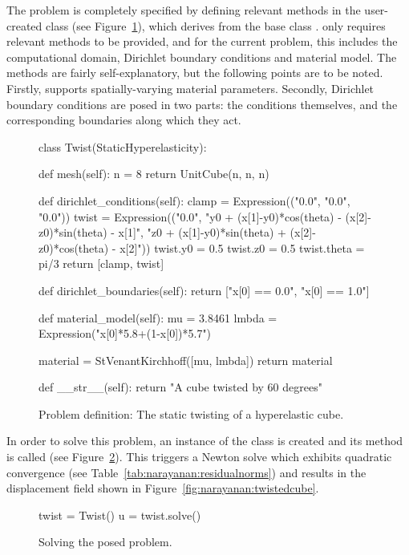 \noindent The problem is completely specified by defining relevant
methods in the user-created class  (see
Figure~\ref{code:narayanan:statictwist}), which derives from the base
class . \twist{} only requires relevant
methods to be provided, and for the current problem, this includes the
computational domain, Dirichlet boundary conditions and material
model. The methods are fairly self-explanatory, but the following
points are to be noted. Firstly, \twist{} supports spatially-varying
material parameters. Secondly, Dirichlet boundary conditions are posed
in two parts: the conditions themselves, and the corresponding
boundaries along which they act.

\begin{figure}[ht]
\begin{python}
class Twist(StaticHyperelasticity):

    def mesh(self):
        n = 8
        return UnitCube(n, n, n)

    def dirichlet_conditions(self):
        clamp = Expression(("0.0", "0.0", "0.0"))
        twist = Expression(("0.0",
        "y0 + (x[1]-y0)*cos(theta) - (x[2]-z0)*sin(theta) - x[1]",
        "z0 + (x[1]-y0)*sin(theta) + (x[2]-z0)*cos(theta) - x[2]"))
        twist.y0 = 0.5
        twist.z0 = 0.5
        twist.theta = pi/3
        return [clamp, twist]

    def dirichlet_boundaries(self):
        return ["x[0] == 0.0", "x[0] == 1.0"]

    def material_model(self):
        mu    = 3.8461
        lmbda = Expression("x[0]*5.8+(1-x[0])*5.7")

        material = StVenantKirchhoff([mu, lmbda])
        return material

    def __str__(self):
        return "A cube twisted by 60 degrees"
\end{python}
\caption{Problem definition: The static twisting of a hyperelastic
  cube.}
\label{code:narayanan:statictwist}
\end{figure}

In order to solve this problem, an instance of the  class
is created and its  method is called (see
Figure~\ref{code:narayanan:solveproblem}). This triggers a Newton
solve which exhibits quadratic convergence (see
Table~\ref{tab:narayanan:residualnorms}) and results in the
displacement field shown in
Figure~\ref{fig:narayanan:twistedcube}.

\begin{figure}[ht]
\begin{python}
twist = Twist()
u = twist.solve()
\end{python}
\caption{Solving the posed problem.}
\label{code:narayanan:solveproblem}
\end{figure}

